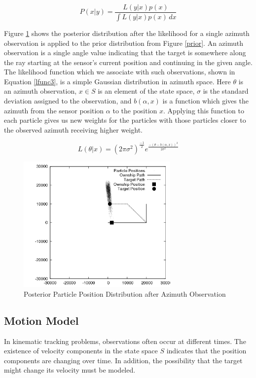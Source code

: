 \documentclass{article}
\begin{document}
\begin{equation}\label{lfunc2}
P(x|y) = \frac{L(y|x)p(x)}{\int \! L(y|x)p(x) \, dx}
\end{equation}

Figure \ref{posterior1} shows the posterior distribution after the likelihood for a single azimuth observation is applied to the prior distribution from Figure \ref{prior}. An azimuth observation is a single angle value indicating that the target is somewhere along the ray starting at the sensor's current position and continuing in the given angle. The likelihood function which we associate with such observations, shown in Equation \ref{lfunc3}, is a simple Gaussian distribution in azimuth space.\cite{bmtt} Here \(\theta\) is an azimuth observation, \(x \in S\) is an element of the state space, \(\sigma\) is the standard deviation assigned to the observation, and \(b(\alpha,x)\) is a function which gives the azimuth from the sensor position \(\alpha\) to the position \(x\). Applying this function to each particle gives us new weights for the particles with those particles closer to the observed azimuth receiving higher weight.

\begin{equation}\label{lfunc3}
L(\theta|x)=(2\pi\sigma^{2})^{\frac{-1}{2}}e^{\frac{-(\theta-b(\alpha,x))^{2}}{2\sigma^{2}}}
\end{equation}

\begin{figure}
\centering
\includegraphics[width=0.7\textwidth]{data/particles_azimuth_obs.png}
\caption{Posterior Particle Position Distribution after Azimuth Observation}
\label{posterior1}
\end{figure}

\subsection{Motion Model}
In kinematic tracking problems, observations often occur at different times. The existence of velocity components in the state space \(S\) indicates that the position components are changing over time. In addition, the possibility that the target might change its velocity must be modeled.
\end{document}
